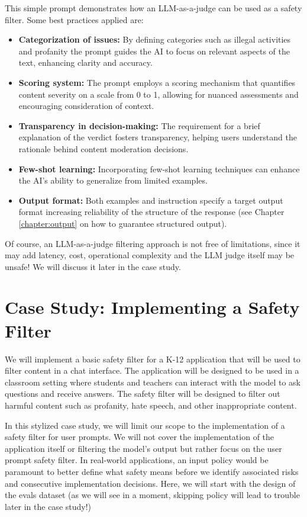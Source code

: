 This simple prompt demonstrates how an LLM-as-a-judge can be used as a safety filter. Some best practices applied are:
\begin{itemize}
\item \textbf{Categorization of issues:} By defining categories such as illegal activities and profanity the prompt guides the AI to focus on relevant aspects of the text, enhancing clarity and accuracy.
\item \textbf{Scoring system:} The prompt employs a scoring mechanism that quantifies content severity on a scale from 0 to 1, allowing for nuanced assessments and encouraging consideration of context.
\item \textbf{Transparency in decision-making:} The requirement for a brief explanation of the verdict fosters transparency, helping users understand the rationale behind content moderation decisions.
\item \textbf{Few-shot learning:} Incorporating few-shot learning techniques can enhance the AI's ability to generalize from limited examples.
\item \textbf{Output format:} Both examples and instruction specify a target output format increasing reliability of the structure of the response (see Chapter \ref{chapter:output} on how to guarantee structured output).
\end{itemize}

Of course, an LLM-as-a-judge filtering approach is not free of limitations, since it may add latency, cost, operational complexity and the LLM judge itself may be unsafe! We will discuss it later in the case study.

\section{Case Study: Implementing a Safety Filter}

We will implement a basic safety filter for a K-12 application that will be used to filter content in a chat interface. The application will be designed to be used in a classroom setting where students and teachers can interact with the model to ask questions and receive answers. The safety filter will be designed to filter out harmful content such as profanity, hate speech, and other inappropriate content.

In this stylized case study, we will limit our scope to the implementation of a safety filter for user prompts. We will not cover the implementation of the application itself or filtering the model's output but rather focus on the user prompt safety filter. In real-world applications, an input policy would be paramount to better define what safety means before we identify associated risks and consecutive implementation decisions. Here, we will start with the design of the evals dataset (as we will see in a moment, skipping policy will lead to trouble later in the case study!)

